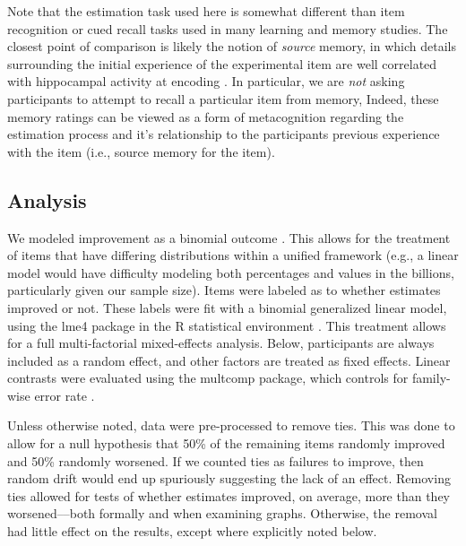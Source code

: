 Note that the estimation task used here is somewhat different than item
recognition or cued recall tasks used in many learning and memory studies. The
closest point of comparison is likely the notion of \emph{source} memory, in
which details surrounding the initial experience of the experimental item are
well correlated with hippocampal activity at encoding
\cite{davachi_multiple_2003}. In particular, we are \emph{not} asking
participants to attempt to recall a particular item from memory, Indeed, these
memory ratings can be viewed as a form of metacognition regarding the estimation
process and it's relationship to the participants previous experience with the
item (i.e., source memory for the item).

\subsection{Analysis}

We modeled improvement as a binomial outcome \cite[as
did]{munnich_longevities_2005}. This allows for the treatment of items that have
differing distributions within a unified framework (e.g., a linear model would
have difficulty modeling both percentages and values in the billions,
particularly given our sample size).  Items were labeled as to whether estimates
improved or not. These labels were fit with a binomial generalized linear model,
using the lme4 package in the R statistical environment
\cite{r_development_core_team_r:_2009_fixed}. This treatment allows for a full
multi-factorial mixed-effects analysis. Below, participants are always included
as a random effect, and other factors are treated as fixed effects. Linear
contrasts were evaluated using the multcomp package, which controls for
family-wise error rate \cite{hothorn_simultaneous_2008}.

Unless otherwise noted, data were pre-processed to remove ties. This was done to
allow for a null hypothesis that 50\% of the remaining items randomly improved
and 50\% randomly worsened. If we counted ties as failures to improve, then
random drift would end up spuriously suggesting the lack of an effect. Removing
ties allowed for tests of whether estimates improved, on average, more than they
worsened––both formally and when examining graphs. Otherwise, the removal had
little effect on the results, except where explicitly noted below.


